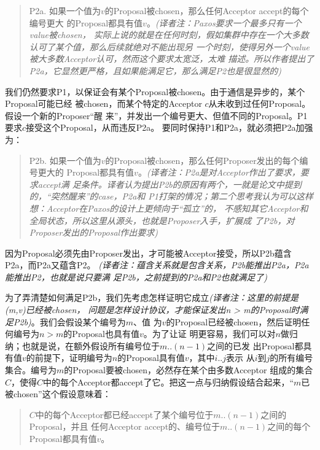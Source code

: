 \begin{quote}
P2a. 如果一个值为\(v\)的Proposal被chosen，那么任何Acceptor accept的每个编号更大
的Proposal都具有值\(v\)。\emph{(译者注：Paxos要求一个最多只有一个value被chosen，
实际上说的就是在任何时刻，假如集群中存在一个大多数认可了某个值，那么后续就绝对不能出现另
一个时刻，使得另外一个value被大多数Acceptor认可，然而这个要求太宽泛，太难
描述。所以作者提出了P2a，它显然更严格，且如果能满足它，那么满足P2也是很显然的)}
\end{quote}

我们仍然要求P1，以保证会有某个Proposal被chosen。由于通信是异步的，某个Proposal可能已经
被chosen，而某个特定的Acceptor \(c\)从未收到过任何Proposal。假设一个新的Proposer“醒
来”，并发出一个编号更大、但值不同的Proposal。P1要求\(c\)接受这个Proposal，从而违反P2a。
要同时保持P1和P2a，就必须把P2a加强为：

\begin{quote}
P2b. 如果一个值为\(v\)的Proposal被chosen，那么任何Proposer发出的每个编号更大的
Proposal都具有值\(v\)。\emph{(译者注：P2a是对Acceptor作出了要求，要求accept满
足条件。译者认为提出P2b的原因有两个，一就是论文中提到的，“突然醒来”的case，P2a和
P1打架的情况；第二个思考我认为可以这样想：Acceptor在Paxos的设计上更倾向于“孤立”的，
不感知其它Acceptor和全局状态，所以这里从源头，也就是Proposer入手，扩展成
了P2b，对Proposer发出的Proposal作出要求)}
\end{quote}

因为Proposal必须先由Proposer发出，才可能被Acceptor接受，所以P2b蕴含P2a，而P2a又蕴含P2。
\emph{(译者注：蕴含关系就是包含关系，P2b能推出P2a，P2a能推出P2，也就是说只要满
足P2b，之前提到的P2a和P2也就满足了)}

为了弄清楚如何满足P2b，我们先考虑怎样证明它成立\emph{(译者注：这里的前提是(m,v)已经被chosen，
问题是怎样设计协议，才能保证发出n > m的Proposal时满足P2b)}。我们会假设某个编号为\(m\)、值
为\(v\)的Proposal已经被chosen，然后证明任何编号为\(n>m\)的Proposal也具有值\(v\)。为了让证
明更容易，我们可以对\(n\)做归纳；也就是说，在额外假设所有编号位于\(m..(n-1)\)之间的已发
出Proposal都具有值\(v\)的前提下，证明编号为\(n\)的Proposal具有值\(v\)，其中\(i..j\)表示
从\(i\)到\(j\)的所有编号集合。编号为\(m\)的Proposal要被chosen，必然存在某个由多数Acceptor
组成的集合\(C\)，使得\(C\)中的每个Acceptor都accept了它。把这一点与归纳假设结合起来，“\(m\)已
被chosen”这个假设意味着：

\begin{quote}
\(C\)中的每个Acceptor都已经accept了某个编号位于\(m..(n-1)\)之间的Proposal，并且
任何Acceptor accept的、编号位于\(m..(n-1)\)之间的每个Proposal都具有值\(v\)。
\end{quote}

